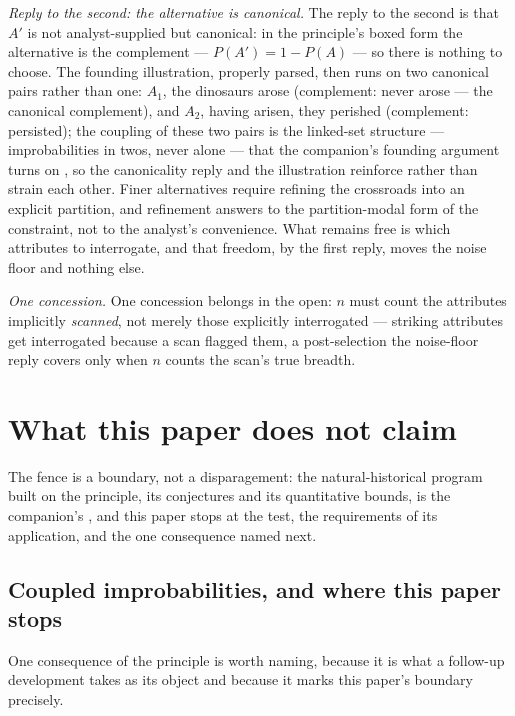 \textit{Reply to the second: the alternative is canonical.} The reply to the second is that $A'$ is not analyst-supplied but canonical: in the principle's boxed form the alternative is the complement --- $P(A') = 1 - P(A)$ --- so there is nothing to choose. The founding illustration, properly parsed, then runs on two canonical pairs rather than one: $A_1$, the dinosaurs arose (complement: never arose --- the canonical complement), and $A_2$, having arisen, they perished (complement: persisted); the coupling of these two pairs is the linked-set structure --- improbabilities in twos, never alone --- that the companion's founding argument turns on \cite{Nexus}, so the canonicality reply and the illustration reinforce rather than strain each other. Finer alternatives require refining the crossroads into an explicit partition, and refinement answers to the partition-modal form of the constraint, not to the analyst's convenience. What remains free is which attributes to interrogate, and that freedom, by the first reply, moves the noise floor and nothing else.

\textit{One concession.} One concession belongs in the open: $n$ must count the attributes implicitly \emph{scanned}, not merely those explicitly interrogated --- striking attributes get interrogated because a scan flagged them, a post-selection the noise-floor reply covers only when $n$ counts the scan's true breadth.

\section{What this paper does not claim}
\label{sec:fence}

The fence is a boundary, not a disparagement: the natural-historical program built on the principle, its conjectures and its quantitative bounds, is the companion's \cite{Nexus}, and this paper stops at the test, the requirements of its application, and the one consequence named next.

\subsection{Coupled improbabilities, and where this paper stops}
\label{sec:coupled}

One consequence of the principle is worth naming, because it is what a follow-up development takes as its object and because it marks this paper's boundary precisely.

